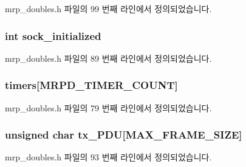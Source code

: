 mrp\+\_\+doubles.\+h 파일의 99 번째 라인에서 정의되었습니다.

\subsubsection[{\texorpdfstring{sock\+\_\+initialized}{sock_initialized}}]{\setlength{\rightskip}{0pt plus 5cm}int sock\+\_\+initialized}\hypertarget{structmrpd__test__state_a0ff41836d678c2a79925a176b08fccf1}{}\label{structmrpd__test__state_a0ff41836d678c2a79925a176b08fccf1}


mrp\+\_\+doubles.\+h 파일의 89 번째 라인에서 정의되었습니다.

\subsubsection[{\texorpdfstring{timers}{timers}}]{ timers\mbox{[}{\bf M\+R\+P\+D\+\_\+\+T\+I\+M\+E\+R\+\_\+\+C\+O\+U\+NT}\mbox{]}}\hypertarget{structmrpd__test__state_addb880c3ca1c2edfcdd2549931b13543}{}\label{structmrpd__test__state_addb880c3ca1c2edfcdd2549931b13543}


mrp\+\_\+doubles.\+h 파일의 79 번째 라인에서 정의되었습니다.

\subsubsection[{\texorpdfstring{tx\+\_\+\+P\+DU}{tx_PDU}}]{\setlength{\rightskip}{0pt plus 5cm}unsigned char tx\+\_\+\+P\+DU\mbox{[}{\bf M\+A\+X\+\_\+\+F\+R\+A\+M\+E\+\_\+\+S\+I\+ZE}\mbox{]}}\hypertarget{structmrpd__test__state_ae91dc00a89d8eee254abdc8dfa703bf0}{}\label{structmrpd__test__state_ae91dc00a89d8eee254abdc8dfa703bf0}


mrp\+\_\+doubles.\+h 파일의 93 번째 라인에서 정의되었습니다.

